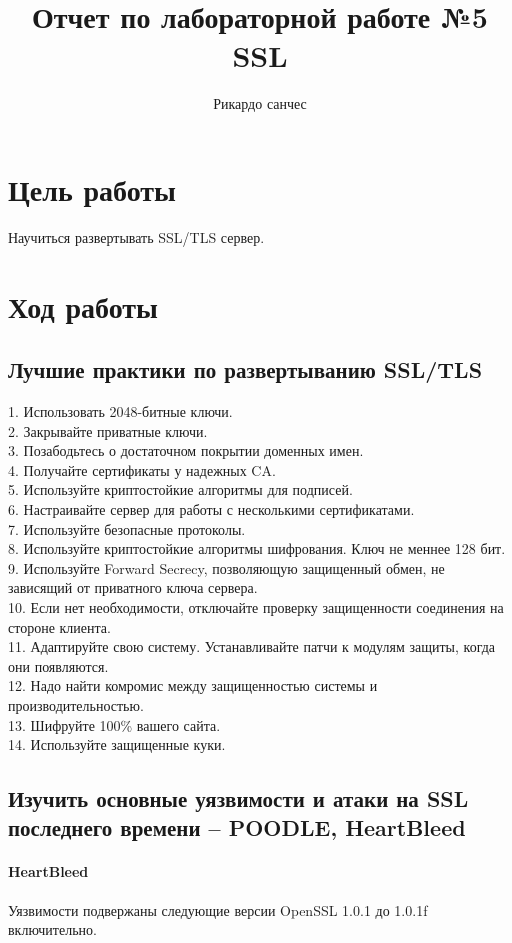 \documentclass[12pt,a4paper]{article}
\author{Рикардо санчес}
\date{}
\title{Отчет по лабораторной работе №5 SSL}
\begin{document}
\maketitle
\section{Цель работы}
Научиться развертывать SSL/TLS сервер.
\section{Ход работы}

\subsection{Лучшие практики по развертыванию SSL/TLS}
1. Использовать 2048-битные ключи.\\
2. Закрывайте приватные ключи.\\
3. Позабодьтесь о достаточном покрытии доменных имен.\\
4. Получайте сертификаты у надежных CA.\\
5. Используйте криптостойкие алгоритмы для подписей.\\
6. Настраивайте сервер для работы с несколькими сертификатами.\\
7. Используйте безопасные протоколы.\\
8. Используйте криптостойкие алгоритмы шифрования. Ключ не меннее 128 бит.\\
9. Используйте Forward Secrecy, позволяющую защищенный обмен, не зависящий от приватного ключа сервера.\\
10. Если нет необходимости, отключайте проверку защищенности соединения на стороне клиента.\\
11. Адаптируйте свою систему. Устанавливайте патчи к модулям защиты, когда они появляются.\\
12. Надо найти комромис между защищенностью системы и производительностью.\\
13. Шифруйте 100\% вашего сайта.\\
14. Используйте защищенные куки.\\

\subsection{Изучить основные уязвимости и атаки на SSL последнего времени – POODLE, HeartBleed}

\paragraph{HeartBleed}
Уязвимости подвержаны следующие версии
OpenSSL 1.0.1 до 1.0.1f включительно.
\end{document}
